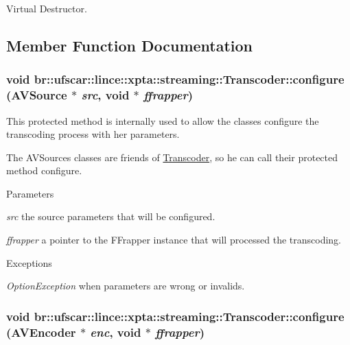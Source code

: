Virtual Destructor. 



\subsection{Member Function Documentation}
\hypertarget{classbr_1_1ufscar_1_1lince_1_1xpta_1_1streaming_1_1Transcoder_a1bdc5f7bbc1aec2d8dcba95ff52bf9fb}{
\subsubsection[{configure}]{\setlength{\rightskip}{0pt plus 5cm}void br::ufscar::lince::xpta::streaming::Transcoder::configure ({\bf AVSource} $\ast$ {\em src}, \/  void $\ast$ {\em ffrapper})}}
\label{classbr_1_1ufscar_1_1lince_1_1xpta_1_1streaming_1_1Transcoder_a1bdc5f7bbc1aec2d8dcba95ff52bf9fb}


This protected method is internally used to allow the classes configure the transcoding process with her parameters. 

The AVSources classes are friends of \hyperlink{classbr_1_1ufscar_1_1lince_1_1xpta_1_1streaming_1_1Transcoder}{Transcoder}, so he can call their protected method configure. 
\begin{DoxyParams}{Parameters}
\item[{\em src}]the source parameters that will be configured. \item[{\em ffrapper}]a pointer to the FFrapper instance that will processed the transcoding. \end{DoxyParams}

\begin{DoxyExceptions}{Exceptions}
\item[{\em OptionException}]when parameters are wrong or invalids. \end{DoxyExceptions}
\hypertarget{classbr_1_1ufscar_1_1lince_1_1xpta_1_1streaming_1_1Transcoder_a825a6bedbdfef10b910fb793b01ec948}{
\subsubsection[{configure}]{\setlength{\rightskip}{0pt plus 5cm}void br::ufscar::lince::xpta::streaming::Transcoder::configure ({\bf AVEncoder} $\ast$ {\em enc}, \/  void $\ast$ {\em ffrapper})}}
\label{classbr_1_1ufscar_1_1lince_1_1xpta_1_1streaming_1_1Transcoder_a825a6bedbdfef10b910fb793b01ec948}


